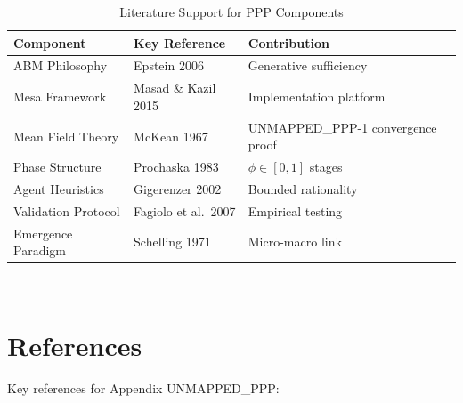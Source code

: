 \begin{table}[htbp]
\centering
\caption{Literature Support for PPP Components}
\label{tab:ppp-literature}
\renewcommand{\arraystretch}{1.2}
\small
\begin{tabular}{@{}lll@{}}
\toprule
\textbf{Component} & \textbf{Key Reference} & \textbf{Contribution} \\
\midrule
ABM Philosophy & Epstein 2006 & Generative sufficiency \\
Mesa Framework & Masad \& Kazil 2015 & Implementation platform \\
Mean Field Theory & McKean 1967 & UNMAPPED_PPP-1 convergence proof \\
Phase Structure & Prochaska 1983 & $\phi \in [0,1]$ stages \\
Agent Heuristics & Gigerenzer 2002 & Bounded rationality \\
Validation Protocol & Fagiolo et al.~2007 & Empirical testing \\
Emergence Paradigm & Schelling 1971 & Micro-macro link \\
\bottomrule
\end{tabular}
\end{table}

---

\section*{References}

\nocite{bcm_master}

Key references for Appendix UNMAPPED_PPP:

